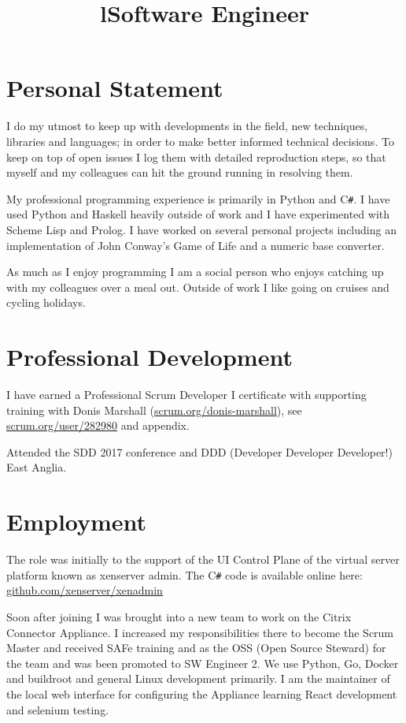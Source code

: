 \documentclass[line,margin]{res}
\title{l} \location{r} \\
\newcommand{\CSharp}{C\texttt{\#}}
\begin{document}
\begin{resume}

\section{Personal Statement}
I do my utmost to keep up with developments in the field,
new techniques, libraries and languages;
in order to make better informed technical decisions.
To keep on top of open issues I log them with detailed reproduction steps,
so that myself and my colleagues can hit the ground running in resolving them.

My professional programming experience is primarily in
Python and {\CSharp}.
I have used Python and Haskell heavily outside of work and
I have experimented with Scheme Lisp and Prolog.
I have worked on several personal projects including an implementation of
John Conway's Game of Life and a numeric base converter.

As much as I enjoy programming I am a social person who enjoys catching up with
my colleagues over a meal out.
Outside of work I like going on cruises and cycling holidays.

\section{Professional Development}
I have earned a Professional Scrum Developer I certificate with supporting
training with Donis Marshall
(\href{https://www.scrum.org/donis-marshall}{scrum.org/donis-marshall}), see
\href{https://www.scrum.org/user/282980}{scrum.org/user/282980} and appendix.

Attended the SDD 2017 conference and
DDD (Developer Developer Developer!) East Anglia.

\section{Employment}

\title{Software Engineer}
\begin{position}
The role was initially to the support of the UI Control Plane
of the virtual server platform known as xenserver admin.
The {\CSharp} code is available online here:
\href{https://github.com/xenserver/xenadmin}{github.com/xenserver/xenadmin}

Soon after joining I was brought into a new team to work on the Citrix Connector Appliance.
I increased my responsibilities there to become the Scrum Master and received SAFe training and as the OSS (Open Source Steward) for the team
and was been promoted to SW Engineer 2.
We use Python, Go, Docker and buildroot and general Linux development primarily.
I am the maintainer of the local web interface for configuring the Appliance learning React development and selenium testing.
\end{position}


\end{resume}
\end{document}
